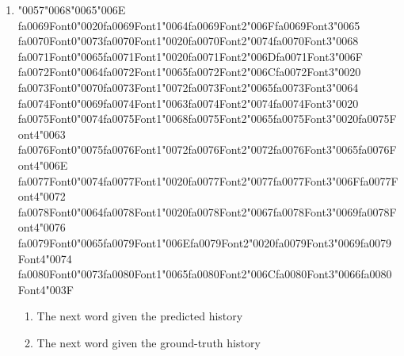 \documentclass[12pt]{article}
\begin{document}
\begin{enumerate}[label=Q\arabic*.]
\begin{enumerate}[label=(\Alph*)]
\end{enumerate}
\item {\char"0057}{\char"0068}{\char"0065}{\char"006E} {\csname fa0069Font0\endcsname\char"0020}{\csname fa0069Font1\endcsname\char"0064}{\csname fa0069Font2\endcsname\char"006F}{\csname fa0069Font3\endcsname\char"0065} {\csname fa0070Font0\endcsname\char"0073}{\csname fa0070Font1\endcsname\char"0020}{\csname fa0070Font2\endcsname\char"0074}{\csname fa0070Font3\endcsname\char"0068} {\csname fa0071Font0\endcsname\char"0065}{\csname fa0071Font1\endcsname\char"0020}{\csname fa0071Font2\endcsname\char"006D}{\csname fa0071Font3\endcsname\char"006F} {\csname fa0072Font0\endcsname\char"0064}{\csname fa0072Font1\endcsname\char"0065}{\csname fa0072Font2\endcsname\char"006C}{\csname fa0072Font3\endcsname\char"0020} {\csname fa0073Font0\endcsname\char"0070}{\csname fa0073Font1\endcsname\char"0072}{\csname fa0073Font2\endcsname\char"0065}{\csname fa0073Font3\endcsname\char"0064} {\csname fa0074Font0\endcsname\char"0069}{\csname fa0074Font1\endcsname\char"0063}{\csname fa0074Font2\endcsname\char"0074}{\csname fa0074Font3\endcsname\char"0020} {\csname fa0075Font0\endcsname\char"0074}{\csname fa0075Font1\endcsname\char"0068}{\csname fa0075Font2\endcsname\char"0065}{\csname fa0075Font3\endcsname\char"0020}{\csname fa0075Font4\endcsname\char"0063} {\csname fa0076Font0\endcsname\char"0075}{\csname fa0076Font1\endcsname\char"0072}{\csname fa0076Font2\endcsname\char"0072}{\csname fa0076Font3\endcsname\char"0065}{\csname fa0076Font4\endcsname\char"006E} {\csname fa0077Font0\endcsname\char"0074}{\csname fa0077Font1\endcsname\char"0020}{\csname fa0077Font2\endcsname\char"0077}{\csname fa0077Font3\endcsname\char"006F}{\csname fa0077Font4\endcsname\char"0072} {\csname fa0078Font0\endcsname\char"0064}{\csname fa0078Font1\endcsname\char"0020}{\csname fa0078Font2\endcsname\char"0067}{\csname fa0078Font3\endcsname\char"0069}{\csname fa0078Font4\endcsname\char"0076} {\csname fa0079Font0\endcsname\char"0065}{\csname fa0079Font1\endcsname\char"006E}{\csname fa0079Font2\endcsname\char"0020}{\csname fa0079Font3\endcsname\char"0069}{\csname fa0079Font4\endcsname\char"0074} {\csname fa0080Font0\endcsname\char"0073}{\csname fa0080Font1\endcsname\char"0065}{\csname fa0080Font2\endcsname\char"006C}{\csname fa0080Font3\endcsname\char"0066}{\csname fa0080Font4\endcsname\char"003F}
\begin{enumerate}[label=(\Alph*)]
    \item The next word given the predicted history
    \item The next word given the ground-truth history

\end{enumerate}
\end{enumerate}
\end{document}
